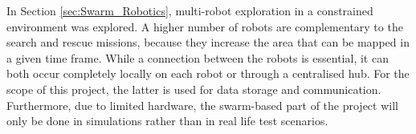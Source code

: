 
In Section \ref{sec:Swarm_Robotics}, multi-robot exploration in a constrained environment was explored. A higher number of robots are complementary to the search and rescue missions, because they increase the area that can be mapped in a given time frame. While a connection between the robots is essential, it can both occur completely locally on each robot or through a centralised hub. For the scope of this project, the latter is used for data storage and communication. Furthermore, due to limited hardware, the swarm-based part of the project will only be done in simulations rather than in real life test scenarios. 

